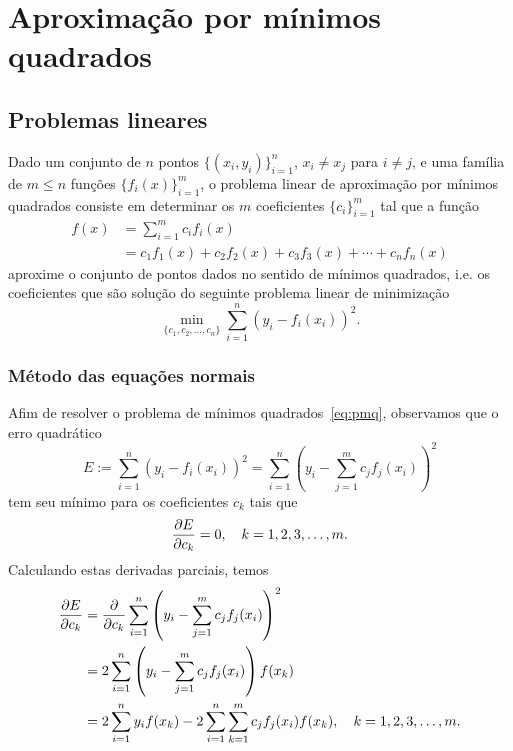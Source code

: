 
\chapter{Aproximação por mínimos quadrados}\label{c_ajuste}
\thispagestyle{fancy}

\section{Problemas lineares}\label{c_ajuste_s_prob_lin}

Dado um conjunto de $n$ pontos $\{(x_i,y_i)\}_{i=1}^n$, $x_i\neq x_j$ para $i\neq j$, e uma família de $m \leq n$ funções $\{f_i(x)\}_{i=1}^m$, o problema linear de aproximação por mínimos quadrados consiste em determinar os $m$ coeficientes $\{c_i\}_{i=1}^m$ tal que a função
\begin{align}    
  f(x) &= \sum_{i=1}^m c_if_i(x) \\
       &= c_1f_1(x) + c_2f_2(x) + c_3f_3(x) + \cdots + c_nf_n(x)
\end{align}
aproxime o conjunto de pontos dados no sentido de mínimos quadrados, i.e. os coeficientes que são solução do seguinte problema linear de minimização
\begin{equation}\label{eq:pmq}
  \min_{\{c_1,c_2,\dotsc,c_n\}} \sum_{i=1}^n (y_i - f_i(x_i))^2.
\end{equation}

\subsection{Método das equações normais}

Afim de resolver o problema de mínimos quadrados~\eqref{eq:pmq}, observamos que o erro quadrático
\begin{equation}
  E := \sum_{i=1}^n (y_i - f_i(x_i))^2 = \sum_{i=1}^n \left(y_i - \sum_{j=1}^m c_jf_j(x_i)\right)^2
\end{equation}
tem seu mínimo para os coeficientes $c_k$ tais que
\begin{equation}\label{eq:aux1_mq}
  \frac{\partial E}{\partial c_k} = 0,\quad k=1, 2, 3, \dotsc, m.
\end{equation}
Calculando estas derivadas parciais, temos
\begin{align}
  \frac{\partial E}{\partial c_k} &= \frac{\partial}{\partial c_k} \sum_{i=1}^n \left(y_i - \sum_{j=1}^m c_jf_j(x_i)\right)^2\\
    &= 2\sum_{i=1}^n \left(y_i - \sum_{j=1}^m c_jf_j(x_i)\right)f(x_k)\\
    &= 2\sum_{i=1}^n y_if(x_k) - 2\sum_{i=1}^n\sum_{k=1}^m c_jf_j(x_i)f(x_k),\quad k=1, 2, 3, \dotsc, m.
\end{align}

